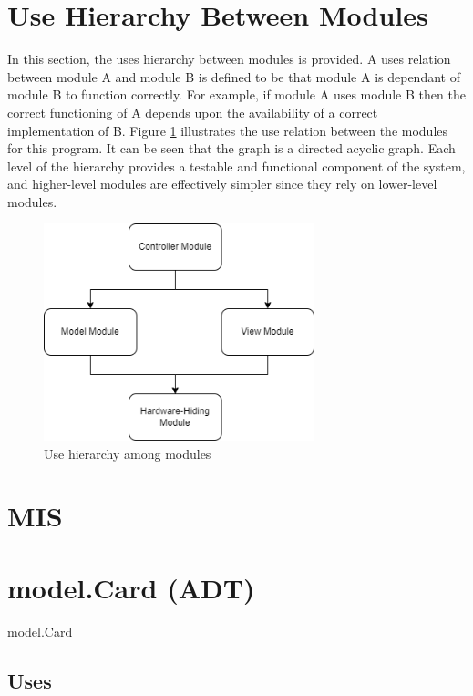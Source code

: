 \documentclass[12pt, titlepage]{article}
\begin{document}
\section{Use Hierarchy Between Modules} \label{SecUse}

In this section, the uses hierarchy between modules is
provided. A uses relation between module A and module B is defined to be that module A is dependant of module B to function correctly. For example, if module A uses module B then the correct functioning of A depends upon the availability of a correct
implementation of B. Figure \ref{FigUH} illustrates the use relation between
the modules for this program. It can be seen that the graph is a directed acyclic graph. Each level of the hierarchy provides a testable and functional component of the system, and higher-level modules are effectively simpler since they rely on lower-level modules.

\begin{figure}[H]
\centering
\includegraphics[width=0.7\textwidth]{Poker_UseDiagram.png}
\caption{Use hierarchy among modules}
\label{FigUH}
\end{figure}

\section{MIS}

\section* {model.Card (ADT)}

model.Card

\subsection* {Uses}
\end{document}
